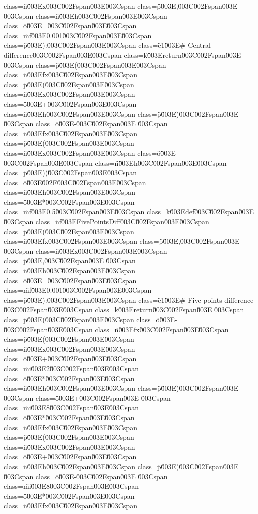 class=\"n\"\u003Ex\u003C\u002Fspan\u003E\u003Cspan class=\"p\"\u003E,\u003C\u002Fspan\u003E \u003Cspan class=\"n\"\u003Eh\u003C\u002Fspan\u003E\u003Cspan class=\"o\"\u003E=\u003C\u002Fspan\u003E\u003Cspan class=\"mf\"\u003E0.001\u003C\u002Fspan\u003E\u003Cspan class=\"p\"\u003E):\u003C\u002Fspan\u003E\n    \u003Cspan class=\"c1\"\u003E# Central difference\u003C\u002Fspan\u003E\n    \u003Cspan class=\"k\"\u003Ereturn\u003C\u002Fspan\u003E \u003Cspan class=\"p\"\u003E(\u003C\u002Fspan\u003E\u003Cspan class=\"n\"\u003Efx\u003C\u002Fspan\u003E\u003Cspan class=\"p\"\u003E(\u003C\u002Fspan\u003E\u003Cspan class=\"n\"\u003Ex\u003C\u002Fspan\u003E\u003Cspan class=\"o\"\u003E+\u003C\u002Fspan\u003E\u003Cspan class=\"n\"\u003Eh\u003C\u002Fspan\u003E\u003Cspan class=\"p\"\u003E)\u003C\u002Fspan\u003E \u003Cspan class=\"o\"\u003E-\u003C\u002Fspan\u003E \u003Cspan class=\"n\"\u003Efx\u003C\u002Fspan\u003E\u003Cspan class=\"p\"\u003E(\u003C\u002Fspan\u003E\u003Cspan class=\"n\"\u003Ex\u003C\u002Fspan\u003E\u003Cspan class=\"o\"\u003E-\u003C\u002Fspan\u003E\u003Cspan class=\"n\"\u003Eh\u003C\u002Fspan\u003E\u003Cspan class=\"p\"\u003E))\u003C\u002Fspan\u003E\u003Cspan class=\"o\"\u003E\u002F\u003C\u002Fspan\u003E\u003Cspan class=\"n\"\u003Eh\u003C\u002Fspan\u003E\u003Cspan class=\"o\"\u003E*\u003C\u002Fspan\u003E\u003Cspan class=\"mf\"\u003E0.5\u003C\u002Fspan\u003E\n\n\u003Cspan class=\"k\"\u003Edef\u003C\u002Fspan\u003E \u003Cspan class=\"nf\"\u003EFivePointsDiff\u003C\u002Fspan\u003E\u003Cspan class=\"p\"\u003E(\u003C\u002Fspan\u003E\u003Cspan class=\"n\"\u003Efx\u003C\u002Fspan\u003E\u003Cspan class=\"p\"\u003E,\u003C\u002Fspan\u003E \u003Cspan class=\"n\"\u003Ex\u003C\u002Fspan\u003E\u003Cspan class=\"p\"\u003E,\u003C\u002Fspan\u003E \u003Cspan class=\"n\"\u003Eh\u003C\u002Fspan\u003E\u003Cspan class=\"o\"\u003E=\u003C\u002Fspan\u003E\u003Cspan class=\"mf\"\u003E0.001\u003C\u002Fspan\u003E\u003Cspan class=\"p\"\u003E):\u003C\u002Fspan\u003E\n    \u003Cspan class=\"c1\"\u003E# Five points difference \u003C\u002Fspan\u003E\n    \u003Cspan class=\"k\"\u003Ereturn\u003C\u002Fspan\u003E \u003Cspan class=\"p\"\u003E(\u003C\u002Fspan\u003E\u003Cspan class=\"o\"\u003E-\u003C\u002Fspan\u003E\u003Cspan class=\"n\"\u003Efx\u003C\u002Fspan\u003E\u003Cspan class=\"p\"\u003E(\u003C\u002Fspan\u003E\u003Cspan class=\"n\"\u003Ex\u003C\u002Fspan\u003E\u003Cspan class=\"o\"\u003E+\u003C\u002Fspan\u003E\u003Cspan class=\"mi\"\u003E2\u003C\u002Fspan\u003E\u003Cspan class=\"o\"\u003E*\u003C\u002Fspan\u003E\u003Cspan class=\"n\"\u003Eh\u003C\u002Fspan\u003E\u003Cspan class=\"p\"\u003E)\u003C\u002Fspan\u003E \u003Cspan class=\"o\"\u003E+\u003C\u002Fspan\u003E \u003Cspan class=\"mi\"\u003E8\u003C\u002Fspan\u003E\u003Cspan class=\"o\"\u003E*\u003C\u002Fspan\u003E\u003Cspan class=\"n\"\u003Efx\u003C\u002Fspan\u003E\u003Cspan class=\"p\"\u003E(\u003C\u002Fspan\u003E\u003Cspan class=\"n\"\u003Ex\u003C\u002Fspan\u003E\u003Cspan class=\"o\"\u003E+\u003C\u002Fspan\u003E\u003Cspan class=\"n\"\u003Eh\u003C\u002Fspan\u003E\u003Cspan class=\"p\"\u003E)\u003C\u002Fspan\u003E \u003Cspan class=\"o\"\u003E-\u003C\u002Fspan\u003E \u003Cspan class=\"mi\"\u003E8\u003C\u002Fspan\u003E\u003Cspan class=\"o\"\u003E*\u003C\u002Fspan\u003E\u003Cspan class=\"n\"\u003Efx\u003C\u002Fspan\u003E\u003Cspan 
